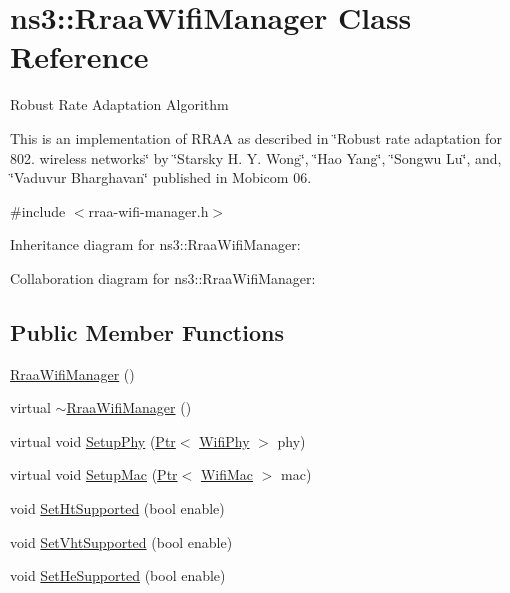 \hypertarget{classns3_1_1RraaWifiManager}{}\section{ns3\+:\+:Rraa\+Wifi\+Manager Class Reference}
\label{classns3_1_1RraaWifiManager}


Robust Rate Adaptation Algorithm

This is an implementation of R\+R\+AA as described in \char`\"{}\+Robust rate adaptation for 802. wireless networks\char`\"{} by \char`\"{}\+Starsky H. Y. Wong\char`\"{}, \char`\"{}\+Hao Yang\char`\"{}, \char`\"{}\+Songwu Lu\char`\"{}, and, \char`\"{}\+Vaduvur Bharghavan\char`\"{} published in Mobicom 06.  




{\ttfamily \#include $<$rraa-\/wifi-\/manager.\+h$>$}



Inheritance diagram for ns3\+:\+:Rraa\+Wifi\+Manager\+:


Collaboration diagram for ns3\+:\+:Rraa\+Wifi\+Manager\+:
\subsection*{Public Member Functions}
\begin{DoxyCompactItemize}
\item 
\hyperlink{classns3_1_1RraaWifiManager_a76acfc1faccec108e565f3e05b7adc59}{Rraa\+Wifi\+Manager} ()
\item 
virtual \hyperlink{classns3_1_1RraaWifiManager_abe5fd98b6a313243506465d7b1cfc6f3}{$\sim$\+Rraa\+Wifi\+Manager} ()
\item 
virtual void \hyperlink{classns3_1_1RraaWifiManager_a67d3a299dffc70ca0c059b7d9a87a702}{Setup\+Phy} (\hyperlink{classns3_1_1Ptr}{Ptr}$<$ \hyperlink{classns3_1_1WifiPhy}{Wifi\+Phy} $>$ phy)
\item 
virtual void \hyperlink{classns3_1_1RraaWifiManager_abe2d1da3e38d9cf9cdd7a71b00a1b3bf}{Setup\+Mac} (\hyperlink{classns3_1_1Ptr}{Ptr}$<$ \hyperlink{classns3_1_1WifiMac}{Wifi\+Mac} $>$ mac)
\item 
void \hyperlink{classns3_1_1RraaWifiManager_a90f15228e9a1d205013df50bcefc8760}{Set\+Ht\+Supported} (bool enable)
\item 
void \hyperlink{classns3_1_1RraaWifiManager_a7864d1ed5dbe690ff3a5e06dceb9657b}{Set\+Vht\+Supported} (bool enable)
\item 
void \hyperlink{classns3_1_1RraaWifiManager_a3fc37e9fb73b3d64737475bf513d518f}{Set\+He\+Supported} (bool enable)
\end{DoxyCompactItemize}
